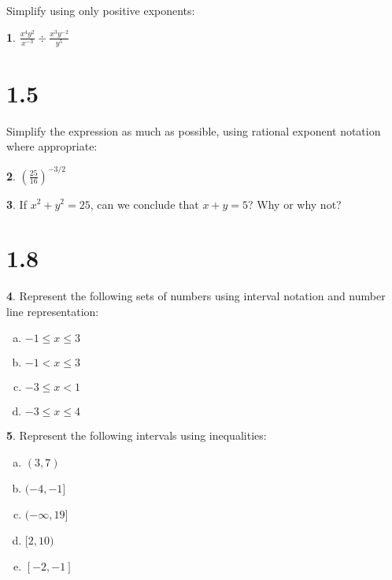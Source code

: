 \documentclass[12pt]{book}
\theoremstyle{definition}
\newtheorem{thm}{}
\begin{document}
Simplify using only positive exponents:
\setcounter{thm}{13}
\begin{thm}
  $\displaystyle{\frac{x^4y^2}{x^{-3}} \div \frac{x^3y^{-2}}{y^5}}$
\end{thm}

\section*{1.5}
Simplify the expression as much as possible, using rational exponent notation where appropriate:
\setcounter{thm}{13}
\begin{thm}
  $\displaystyle{\left(\frac{25}{16}\right)^{-3/2}}$
\end{thm}

\setcounter{thm}{29}
\begin{thm}
  If $x^2 + y^2 = 25$, can we conclude that $x + y = 5$?
  Why or why not?
\end{thm}

\section*{1.8}

\setcounter{thm}{0}
\begin{thm}
  Represent the following sets of numbers using interval notation and number line representation:
  \begin{enumerate}[(a)]
    \item
      $\displaystyle{-1 \leq x \leq 3}$
    \item
      $\displaystyle{-1 < x \leq 3}$
    \item
      $\displaystyle{-3 \leq x < 1}$
    \item
      $\displaystyle{-3 \leq x \leq 4}$
  \end{enumerate}
  
\end{thm}

\setcounter{thm}{2}
\begin{thm}
  Represent the following intervals using inequalities:
  \begin{enumerate}[(a)]
  \item
    $\displaystyle{(3,7)}$
  \item
    $\displaystyle{(-4,-1]}$
  \item
    $\displaystyle{(-\infty, 19]}$
  \item
    $\displaystyle{[2,10)}$
  \item
    $\displaystyle{[-2,-1]}$
  \end{enumerate}
\end{thm}
\end{document}
